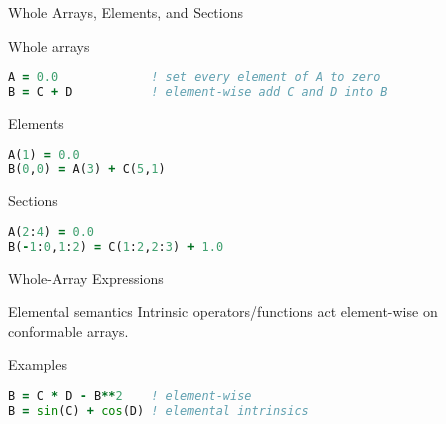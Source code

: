 \begin{frame}[fragile]{Whole Arrays, Elements, and Sections}
  \begin{block}{Whole arrays}
\begin{lstlisting}[language=Fortran]
A = 0.0             ! set every element of A to zero
B = C + D           ! element-wise add C and D into B
\end{lstlisting}
  \end{block}
  \begin{block}{Elements}
\begin{lstlisting}[language=Fortran]
A(1) = 0.0
B(0,0) = A(3) + C(5,1)
\end{lstlisting}
  \end{block}
  \begin{block}{Sections}
\begin{lstlisting}[language=Fortran]
A(2:4) = 0.0
B(-1:0,1:2) = C(1:2,2:3) + 1.0
\end{lstlisting}
  \end{block}
\end{frame}

\begin{frame}[fragile]{Whole-Array Expressions}
  \begin{block}{Elemental semantics}
    Intrinsic operators/functions act element-wise on conformable arrays.
  \end{block}
  \begin{block}{Examples}
\begin{lstlisting}[language=Fortran]
B = C * D - B**2    ! element-wise
B = sin(C) + cos(D) ! elemental intrinsics
\end{lstlisting}
  \end{block}
\end{frame}


